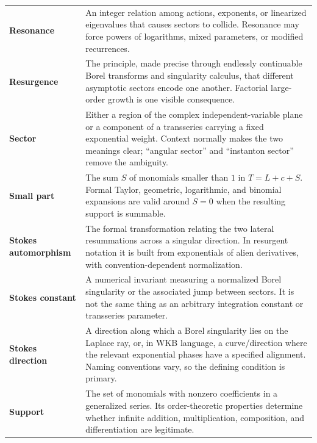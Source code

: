 \documentclass[11pt,openany]{book}
\theoremstyle{definition}
\theoremstyle{plain}
\theoremstyle{remark}
\begin{document}
\begin{longtable}{@{}p{}p{}@{}}
\textbf{Resonance}\index{resonance}
& An integer relation among actions, exponents, or linearized eigenvalues that
causes sectors to collide. Resonance may force powers of logarithms, mixed
parameters, or modified recurrences.\\

\textbf{Resurgence}\index{resurgence}
& The principle, made precise through endlessly continuable Borel transforms
and singularity calculus, that different asymptotic sectors encode one
another. Factorial large-order growth is one visible consequence.\\

\textbf{Sector}\index{transseries sector}
& Either a region of the complex independent-variable plane or a component
of a transseries carrying a fixed exponential weight. Context normally makes
the two meanings clear; ``angular sector'' and ``instanton sector'' remove the
ambiguity.\\

\textbf{Small part}\index{small part}
& The sum $S$ of monomials smaller than $1$ in $T=L+c+S$. Formal Taylor,
geometric, logarithmic, and binomial expansions are valid around $S=0$ when
the resulting support is summable.\\

\textbf{Stokes automorphism}\index{Stokes automorphism}
& The formal transformation relating the two lateral resummations across a
singular direction. In resurgent notation it is built from exponentials of
alien derivatives, with convention-dependent normalization.\\

\textbf{Stokes constant}\index{Stokes constant}
& A numerical invariant measuring a normalized Borel singularity or the
associated jump between sectors. It is not the same thing as an arbitrary
integration constant or transseries parameter.\\

\textbf{Stokes direction}\index{Stokes direction}
& A direction along which a Borel singularity lies on the Laplace ray, or,
in WKB language, a curve/direction where the relevant exponential phases have
a specified alignment. Naming conventions vary, so the defining condition is
primary.\\

\textbf{Support}\index{support}
& The set of monomials with nonzero coefficients in a generalized series.
Its order-theoretic properties determine whether infinite addition,
multiplication, composition, and differentiation are legitimate.\\


\end{longtable}
\end{document}

